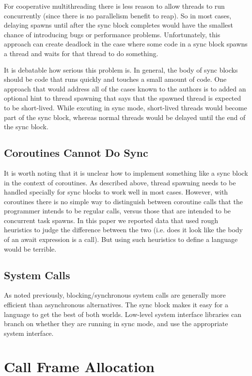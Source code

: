 \documentclass[a4paper,UKenglish,cleveref, autoref]{lipics-v2019}
\begin{document}
For cooperative multithreading there is less reason to allow threads to run concurrently (since there is no parallelism benefit to reap).
So in most cases, delaying spawns until after the sync block completes would have the smallest chance of introducing bugs or performance problems.
Unfortunately, this approach can create deadlock in the case where some code in a sync block spawns a thread and waits for that thread to do something.

It is debatable how serious this problem is.
In general, the body of sync blocks should be code that runs quickly and touches a small amount of code.
One approach that would address all of the cases known to the authors is to added an optional hint to thread spawning that says that the spawned thread is expected to be short-lived.
While excuting in sync mode, short-lived threads would become part of the sync block, whereas normal threads would be delayed until the end of the sync block.

\subsection{Coroutines Cannot Do Sync}

It is worth noting that it is unclear how to implement something like a sync block in the context of coroutines.
As described above, thread spawning needs to be handled specially for sync blocks to work well in most cases.
However, with coroutines there is no simple way to distinguish between coroutine calls that the programmer intends to be regular calls, versus those that are intended to be concurrent task spawns.
In this paper we reported data that used rough heuristics to judge the difference between the two (i.e. does it look like the body of an await expression is a call).
But using such heuristics to define a language would be terrible.

\subsection{System Calls}

As noted previously, blocking{\slash}synchronous system calls are generally more efficient than asynchronous alternatives.
The sync block makes it easy for a language to get the best of both worlds.
Low-level system interface libraries can branch on whether they are running in sync mode, and use the appropriate system interface.

\section{Call Frame Allocation}
\label{sec:hot_stacking}
\end{document}
